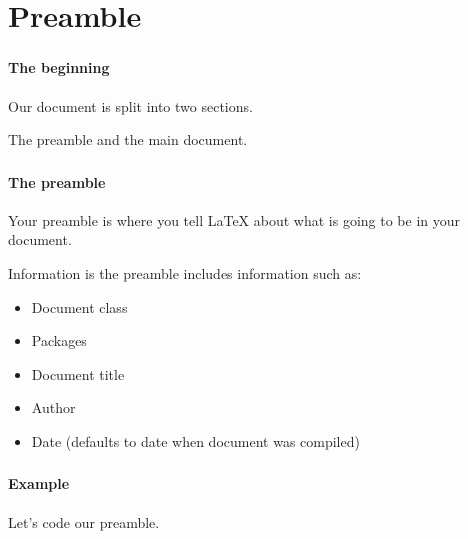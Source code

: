 \documentclass{beamer}
\begin{document}
	\section{Preamble}
	\begin{frame}
		\frametitle{\secname}
		\framesubtitle{The beginning}
		Our document is split into two sections.

		The \alert{preamble} and the \alert{main document}.
	\end{frame}
	\begin{frame}
		\frametitle{\secname}
		\framesubtitle{The preamble}
		Your preamble is where you tell \LaTeX{} about what is going to be in your document.

		Information is the preamble includes information such as:
		\begin{itemize}[<+->]
			\item Document class
			\item Packages
			\item Document title
			\item Author
			\item Date (defaults to date when document was compiled)
		\end{itemize}
	\end{frame}
	\begin{frame}
		\frametitle{\secname}
		\framesubtitle{Example}
		Let's code our preamble.
		
	\end{frame}
\end{document}
